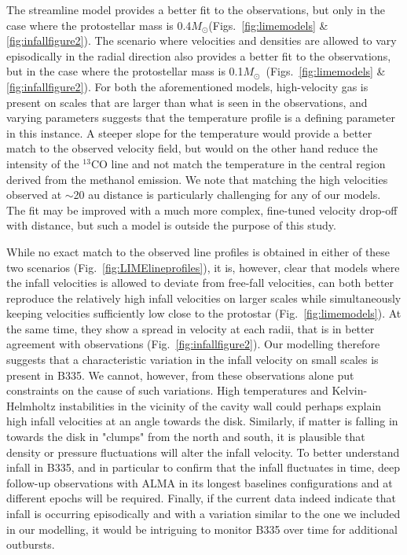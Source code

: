 \documentclass{aa}
\newcommand{\trettenco}{$^{13}$CO\xspace}
\newcommand{\msun}{\ensuremath{M_{\odot}}\xspace}
\begin{document}
The streamline model provides a better fit to the observations, but only in the case where the protostellar mass is 0.4\msun (Figs.~\ref{fig:limemodels} \& \ref{fig:infallfigure2}). The scenario where velocities and densities are allowed to vary episodically in the radial direction also provides a better fit to the observations, but in the case where the protostellar mass is 0.1\msun~(Figs.~\ref{fig:limemodels} \& \ref{fig:infallfigure2}). For both the aforementioned models, high-velocity gas is present on scales that are larger than what is seen in the observations, and varying parameters suggests that the temperature profile is a defining parameter in this instance. A steeper slope for the temperature would provide a better match to the observed velocity field, but would on the other hand reduce the intensity of the \trettenco line and not match the temperature in the central region derived from the methanol emission. We note that matching the high velocities observed at $\sim$20 au distance is particularly challenging for any of our models. The fit may be improved with a much more complex, fine-tuned velocity drop-off with distance, but such a model is outside the purpose of this study.


While no exact match to the observed line profiles is obtained in either of these two scenarios (Fig.~\ref{fig:LIMElineprofiles}), it is, however, clear that models where the infall velocities is allowed to deviate from free-fall velocities, can both better reproduce the relatively high infall velocities on larger scales while simultaneously keeping velocities sufficiently low close to the protostar (Fig.~\ref{fig:limemodels}). At the same time, they show a spread in velocity at each radii, that is in better agreement with observations (Fig.~\ref{fig:infallfigure2}). Our modelling therefore suggests that a characteristic variation in the infall velocity on small scales is present in B335. We cannot, however, from these observations alone put constraints on the cause of such variations. High temperatures and Kelvin-Helmholtz instabilities in the vicinity of the cavity wall could perhaps explain high infall velocities at an angle towards the disk. Similarly, if matter is falling in towards the disk in "clumps" from the north and south, it is plausible that density or pressure fluctuations will alter the infall velocity. To better understand infall in B335, and in particular to confirm that the infall fluctuates in time, deep follow-up observations with ALMA in its longest baselines configurations and at different epochs will be required. Finally, if the current data indeed indicate that infall is occurring episodically and with a variation similar to the one we included in our modelling, it would be intriguing to monitor B335 over time for additional outbursts.
\end{document}
